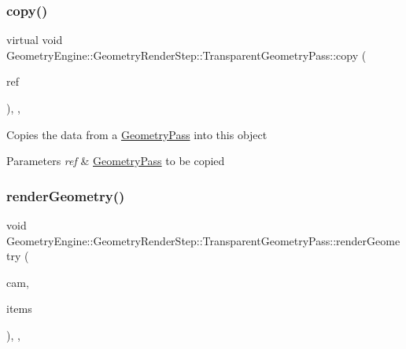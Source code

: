 \subsubsection{\texorpdfstring{copy()}{copy()}}
{\footnotesize\ttfamily virtual void Geometry\+Engine\+::\+Geometry\+Render\+Step\+::\+Transparent\+Geometry\+Pass\+::copy (\begin{DoxyParamCaption}\item[{const \mbox{\hyperlink{class_geometry_engine_1_1_geometry_render_step_1_1_transparent_geometry_pass}{Transparent\+Geometry\+Pass}} \&}]{ref }\end{DoxyParamCaption})\hspace{0.3cm}{\ttfamily [inline]}, {\ttfamily [protected]}, {\ttfamily [virtual]}}

Copies the data from a \mbox{\hyperlink{class_geometry_engine_1_1_geometry_render_step_1_1_geometry_pass}{Geometry\+Pass}} into this object 
\begin{DoxyParams}{Parameters}
{\em ref} & \mbox{\hyperlink{class_geometry_engine_1_1_geometry_render_step_1_1_geometry_pass}{Geometry\+Pass}} to be copied \\
\hline
\end{DoxyParams}
\mbox{\label{class_geometry_engine_1_1_geometry_render_step_1_1_transparent_geometry_pass_a22bae026c0e006318d5ab21bdaeeb247}} 
\subsubsection{\texorpdfstring{renderGeometry()}{renderGeometry()}}
{\footnotesize\ttfamily void Geometry\+Engine\+::\+Geometry\+Render\+Step\+::\+Transparent\+Geometry\+Pass\+::render\+Geometry (\begin{DoxyParamCaption}\item[{\mbox{\hyperlink{class_geometry_engine_1_1_geometry_world_item_1_1_geometry_camera_1_1_camera}{Geometry\+World\+Item\+::\+Geometry\+Camera\+::\+Camera}} $\ast$}]{cam,  }\item[{std\+::unordered\+\_\+set$<$ \mbox{\hyperlink{class_geometry_engine_1_1_geometry_world_item_1_1_geometry_item_1_1_geometry_item}{Geometry\+World\+Item\+::\+Geometry\+Item\+::\+Geometry\+Item}} $\ast$ $>$ $\ast$}]{items }\end{DoxyParamCaption})\hspace{0.3cm}{\ttfamily [override]}, {\ttfamily [protected]}, {\ttfamily [virtual]}}

